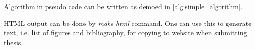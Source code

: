 

Algorithm in pseudo code can be written as demoed in \autoref{alg:simple_algorithm}.



HTML output can be done by \emph{make html} command.
One can use this to generate text, i.e. list of figures and bibliography, for copying to website when submitting thesis.

